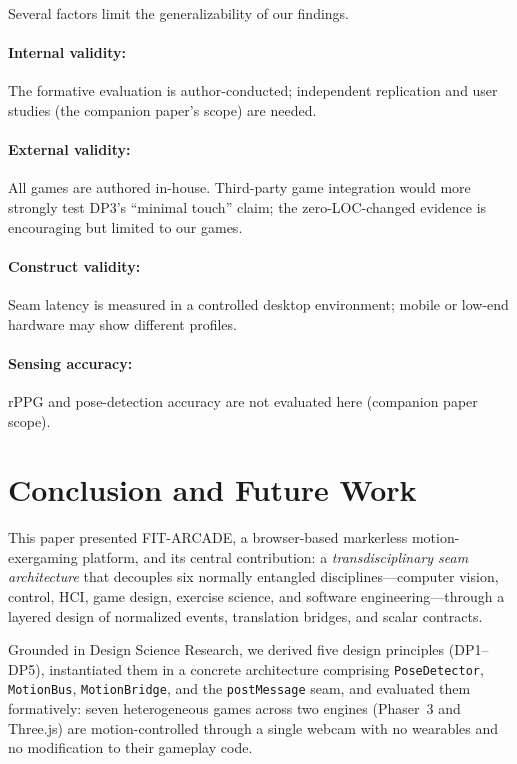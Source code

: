 \documentclass[runningheads]{llncs}
\newcommand{\sys}{\textsc{FIT-ARCADE}}
\newcommand{\motionbus}{\texttt{MotionBus}}
\newcommand{\motionbridge}{\texttt{MotionBridge}}
\newcommand{\postmsg}{\texttt{postMessage}}
\begin{document}
Several factors limit the generalizability of our findings.
\paragraph{Internal validity:} The formative evaluation is
author-conducted; independent replication and user studies
(the companion paper's scope) are needed.
\paragraph{External validity:} All games are authored in-house.
Third-party game integration would more strongly test DP3's
``minimal touch'' claim; the zero-LOC-changed evidence is
encouraging but limited to our games.
\paragraph{Construct validity:} Seam latency is measured in a
controlled desktop environment; mobile or low-end hardware may
show different profiles.
\paragraph{Sensing accuracy:} rPPG and pose-detection accuracy are
not evaluated here (companion paper scope).

\section{Conclusion and Future Work}
\label{sec:conclusion}

This paper presented \sys{}, a browser-based markerless motion-exergaming
platform, and its central contribution: a \emph{transdisciplinary seam
architecture} that decouples six normally entangled disciplines---computer
vision, control, HCI, game design, exercise science, and software
engineering---through a layered design of normalized events, translation
bridges, and scalar contracts.

Grounded in Design Science Research, we derived five design principles
(DP1--DP5), instantiated them in a concrete architecture comprising
\texttt{PoseDetector}, \motionbus{}, \motionbridge{}, and the
\postmsg{} seam, and evaluated them formatively: seven heterogeneous
games across two engines (Phaser~3 and Three.js) are motion-controlled
through a single webcam with no wearables and no modification to their
gameplay code.
\end{document}

